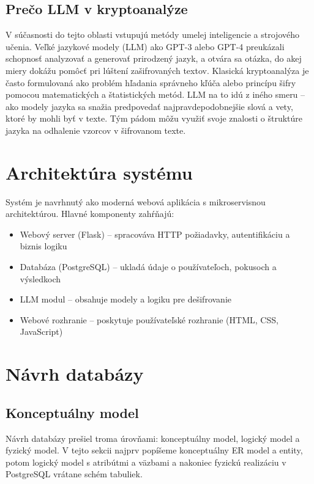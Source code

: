 \documentclass[12pt,a4paper]{article}
\begin{document}
\subsection{Prečo LLM v kryptoanalýze}
V súčasnosti do tejto oblasti vstupujú metódy umelej inteligencie a strojového učenia. Veľké jazykové modely (LLM) ako GPT-3 alebo GPT-4 preukázali schopnosť analyzovať a generovať prirodzený jazyk, a otvára sa otázka, do akej miery dokážu pomôcť pri lúštení zašifrovaných textov. Klasická kryptoanalýza je často formulovaná ako problém hľadania správneho kľúča alebo princípu šifry pomocou matematických a štatistických metód. LLM na to idú z iného smeru -- ako modely jazyka sa snažia predpovedať najpravdepodobnejšie slová a vety, ktoré by mohli byť v texte. Tým pádom môžu využiť svoje znalosti o štruktúre jazyka na odhalenie vzorcov v šifrovanom texte.

\section{Architektúra systému}
Systém je navrhnutý ako moderná webová aplikácia s mikroservisnou architektúrou. Hlavné komponenty zahŕňajú:

\begin{itemize}
    \item Webový server (Flask) -- spracováva HTTP požiadavky, autentifikáciu a biznis logiku
    \item Databáza (PostgreSQL) -- ukladá údaje o používateľoch, pokusoch a výsledkoch
    \item LLM modul -- obsahuje modely a logiku pre dešifrovanie
    \item Webové rozhranie -- poskytuje používateľské rozhranie (HTML, CSS, JavaScript)
\end{itemize}

\section{Návrh databázy}
\subsection{Konceptuálny model}
Návrh databázy prešiel troma úrovňami: konceptuálny model, logický model a fyzický model. V tejto sekcii najprv popíšeme konceptuálny ER model a entity, potom logický model s atribútmi a väzbami a nakoniec fyzickú realizáciu v PostgreSQL vrátane schém tabuliek.
\end{document}
